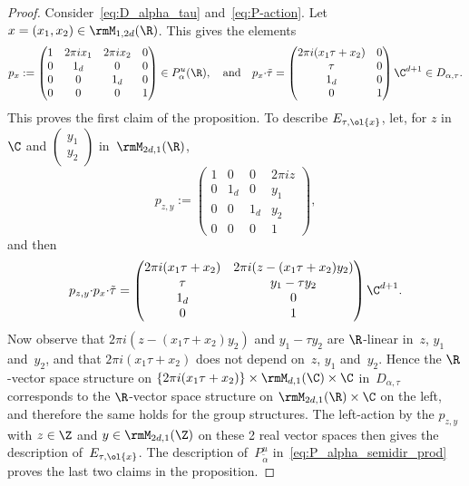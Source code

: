 \begin{proof}
Consider~\eqref{eq:D_alpha_tau} and~\eqref{eq:P-action}.
Let $x=(x_1,x_2)\in\rmM_{1,2d}(\R)$. This gives the elements
\[
p_x :=
\begin{pmatrix}
1 & 2\pi ix_1 & 2\pi ix_2 & 0\\
0 & 1_d & 0 & 0\\
0 & 0 & 1_d & 0\\
0 & 0 & 0 & 1
\end{pmatrix}
\in P^u_\alpha(\R),
\quad
\text{and}
\quad
p_x{\cdot}\tilde{\tau} =
\begin{pmatrix}
2\pi i(x_1\tau + x_2)& 0\\
\tau & 0\\ 1_d & 0\\ 0 & 1
\end{pmatrix}
\C^{d+1}\in D_{\alpha,\tau}.
\]
This proves the first claim of the proposition. To describe
$E_{\tau,\ol{x}}$, let, for $z$ in~$\C$ and
$(\begin{smallmatrix}y_1\\y_2\end{smallmatrix})$ in~$\rmM_{2d,1}(\R)$,
\[
p_{z,y} :=
\begin{pmatrix}
1 & 0 & 0 & 2\pi i z\\
0 & 1_d & 0 & y_1\\
0 & 0 & 1_d & y_2\\
0 & 0 & 0 & 1
\end{pmatrix},
\]
and then
\[
p_{z,y}{\cdot}p_x{\cdot}\tilde{\tau} =
\begin{pmatrix}
2\pi i(x_1\tau + x_2)& 2\pi i(z-(x_1\tau+x_2)y_2)\\
\tau & y_1-\tau y_2\\ 1_d & 0\\ 0 & 1
\end{pmatrix}
\C^{d+1}.
\]
Now observe that $2\pi i(z-(x_1\tau+x_2)y_2)$ and $y_1-\tau y_2$ are
$\R$-linear in~$z$, $y_1$ and~$y_2$, and that $2\pi i(x_1\tau + x_2)$
does not depend on~$z$, $y_1$ and~$y_2$. Hence the $\R$-vector space
structure on $\{2\pi i(x_1\tau + x_2)\}\times\rmM_{d,1}(\C)\times \C$
in~$D_{\alpha,\tau}$ corresponds to the $\R$-vector space structure on
$\rmM_{2d,1}(\R)\times\C$ on the left, and therefore the same holds
for the group structures. The left-action by the $p_{z,y}$ with
$z\in\Z$ and $y\in\rmM_{2d,1}(\Z)$ on these 2 real vector spaces then
gives the description of~$E_{\tau,\ol{x}}$. The description
of~$P^u_{\tilde{\alpha}}$ in~\eqref{eq:P_alpha_semidir_prod} proves
the last two claims in the proposition.
\end{proof}

